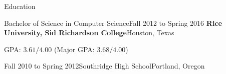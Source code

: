 \documentclass{resume}
\begin{document}
\begin{rSection}{Education}

\begin{rSubSection}{Bachelor of Science in Computer Science}{Fall 2012 to Spring 2016}
{\bf Rice University\normalfont, Sid Richardson College}{Houston, Texas}
\item GPA: $3.61/4.00$ (Major GPA: $3.68/4.00$)
\end{rSubSection}

{Fall 2010 to Spring 2012}{Southridge High School}{Portland, Oregon}

\end{rSection}





\iftoggle{cv}{}{

\begin{rSection}{Work Experience}

\begin{rSubSection}{YASP: Another Stats Page (\texttt{https://yasp.co})}{}
{Co-Founder, Software Developer, Public Relations}{Fall 2014 to present}
\item YASP provides statistics for the video game Dota 2.
\end{rSubSection}

\begin{rSubSection}{Jones McClure Publishing}{Houston, Texas}
{Software Development Intern}{Summer 2013}
\item Created a mobile version of O'Connor's Online.
\end{rSubSection}

\end{rSection}
    
}
\end{document}
